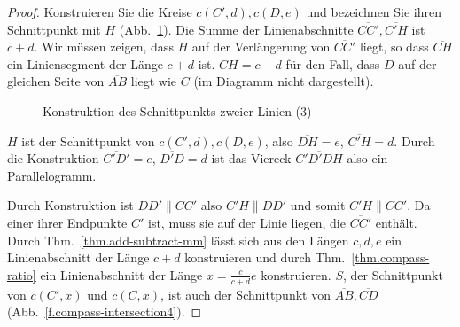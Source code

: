 \begin{proof}
Konstruieren Sie die Kreise $c(C',d), c(D,e)$ und bezeichnen Sie ihren Schnittpunkt mit $H$ (Abb.~\ref{f.compass-intersection3}). Die Summe der Linienabschnitte $\overline{CC'}, \overline{C'H}$ ist $c + d$. Wir müssen zeigen, dass $H$ auf der Verlängerung von $\overline{CC'}$ liegt, so dass $\overline{CH}$ ein Liniensegment der Länge $c+d$ ist. $\overline{CH} = c - d$ für den Fall, dass $D$ auf der gleichen Seite von $\overline{AB}$ liegt wie $C$ (im Diagramm nicht dargestellt).
\begin{figure}[b]
\begin{center}
\end{center}
\caption{Konstruktion des Schnittpunkts zweier Linien (3)}\label{f.compass-intersection3}
\end{figure}

$H$ ist der Schnittpunkt von $c(C',d), c(D,e)$, also $\overline{DH}=e$, $\overline{C'H}=d$. Durch die Konstruktion $\overline{C'D'} = e$, $\overline{D'D}=d$ ist das Viereck $\overline{C'D'DH}$ also ein Parallelogramm. 

Durch Konstruktion ist $\overline{DD'}\parallel\overline{CC'}$ also $\overline{C'H}\parallel \overline{DD'}$ und somit $\overline{C'H}\parallel\overline{CC'}$. Da einer ihrer Endpunkte $C'$ ist, muss sie auf der Linie liegen, die $\overline{CC'}$ enthält. Durch Thm.~\ref{thm.add-subtract-mm} lässt sich aus den Längen $c,d,e$ ein Linienabschnitt der Länge $c+d$ konstruieren und durch Thm.~\ref{thm.compass-ratio} ein Linienabschnitt der Länge $x=\displaystyle\frac{c}{c+d}e$ konstruieren. $S$, der Schnittpunkt von $c(C',x)$ und $c(C,x)$, ist auch der Schnittpunkt von $\overline{AB}, \overline{CD}$ (Abb.~\ref{f.compass-intersection4}).
\end{proof}

